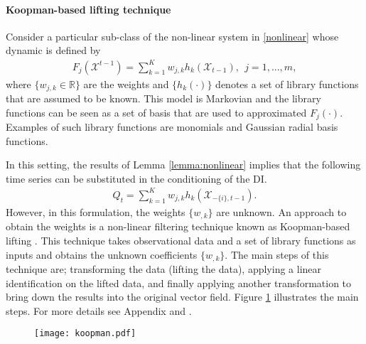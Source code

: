 \paragraph{Koopman-based lifting technique}
Consider a particular sub-class of the non-linear system in \eqref{nonlinear} whose dynamic is defined by
\begin{align}\label{nonlin}
F_{j}(\mathcal{X}^{t-1}) = \sum_{k=1}^K w_{j,k} h_k(\mathcal{X}_{t-1}), \ \ j=1,...,m,
\end{align}
where $\{w_{j,k}\in\mathbb{R}\}$ are the weights and $\{h_k(\cdot)\}$ denotes a set of library functions that are assumed to be known.
This model is Markovian and the library functions can be seen as a set of basis that are used to approximated $F_j(\cdot)$.
Examples of such library functions are monomials and Gaussian radial basis functions. 



In this setting, the results of Lemma \ref{lemma:nonlinear} implies that the following time series can be substituted in the conditioning of the DI. 
\begin{align}
    Q_t = \sum_{k=1}^K w_{j,k} h_k(\mathcal{X}_{-\{i\},t-1}).
\end{align}
However, in this formulation, the weights $\{w_{,k}\}$ are unknown. 
An approach to obtain the weights is a non-linear filtering technique known as Koopman-based lifting \citet{koopman1931hamiltonian}. 
This technique takes observational data and a set of library functions as inputs and obtains the unknown coefficients $\{w_{,k}\}$.
The main steps of this technique are; transforming the data (lifting the data),  applying a linear identification on the lifted data, and finally applying another transformation to bring down the results into the original vector field.  Figure \ref{fig:koopman} illustrates the main steps. For more details see Appendix and \citet{mauroy2019koopman}. 
\begin{figure}
\centering
\texttt{[image: koopman.pdf]}
\label{fig:koopman}
\end{figure}

